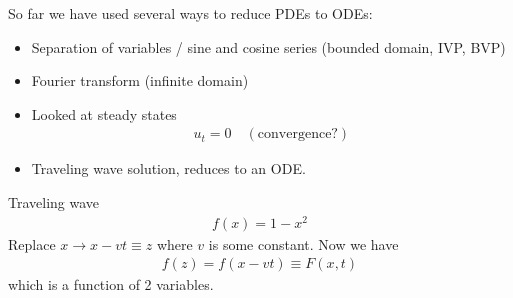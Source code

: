 \documentclass[12pt, letterpaper]{article}
\begin{document}
So far we have used several ways to reduce PDEs to ODEs: 
\begin{itemize}
    \item Separation of variables / sine and cosine series (bounded domain, IVP, BVP)
    \item Fourier transform (infinite domain)
    \item Looked at steady states 
    \begin{align*}
        u_t = 0\quad (\text{convergence?})
    \end{align*}
    \item Traveling wave solution, reduces to an ODE.
\end{itemize}
 Traveling wave
\begin{align*}
    f(x) = 1 - x^2
\end{align*}
Replace $x \rightarrow x - vt \equiv z$ where $v$ is some constant. Now we have
\begin{align*}
    f(z) = f(x - vt) \equiv F(x,t)
\end{align*}
which is a function of 2 variables.
\end{document}
